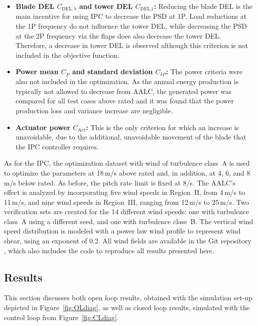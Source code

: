 \begin{itemize}
    \item \textbf{Blade DEL $C_{\text{DEL},b}$ and tower DEL $C_{\text{DEL,t}}$:} Reducing the blade DEL is the main incentive for using
    IPC to decrease the PSD at 1P. Load reductions at the 1P frequency do
    not influence the tower DEL, while decreasing the PSD at the 2P frequency via the
    flaps does also decrease the tower DEL. Therefore, a decrease in tower DEL is observed although this criterion is not included in the objective function.  
    \item \textbf{Power mean $C_{\bar{P}}$ and standard deviation $C_{\delta P}$:} The power criteria were also not included in the
    optimization. As the annual energy production is typically not allowed to decrease from AALC,
    the generated power was compared for all test cases above rated and it was found
    that the power production loss and variance increase are negligible. %
    \item \textbf{Actuator power $C_{\text{Act}}$:} This is the only criterion for which an increase is
    unavoidable, due to the additional, unavoidable movement of the blade that
    the IPC controller requires. %
\end{itemize}
As for the IPC, the optimization dataset with wind of turbulence class~A is used to optimize the parameters at 18\,m/s above rated and, in addition, at 4, 6, and 8\,m/s below rated. As before, the pitch rate limit is fixed at 8\textdegree/s. The AALC's effect is analyzed by incorporating five wind speeds in Region~II, from 4\,m/s to 11\,m/s, and nine wind speeds in Region~III, ranging from 12\,m/s to 25\,m/s. Two verification sets are created for the 14 different wind speeds: one with turbulence class~A using a different seed, and one with turbulence class~B. The vertical wind speed distribution is modeled with a power law wind profile to represent wind shear, using an exponent of 0.2. All wind fields are available in the Git repository \cite{GitRepoCodeAALC}, which also includes the code to reproduce all results presented here. 

\subsection{Results} \label{subsec:ResultsTEF}
This section discusses both open loop results, obtained with the simulation set-up depicted in Figure~\ref{fig:OLdiag}, as well as closed loop results, simulated with the control loop from Figure~\ref{fig:CLdiag}. 

